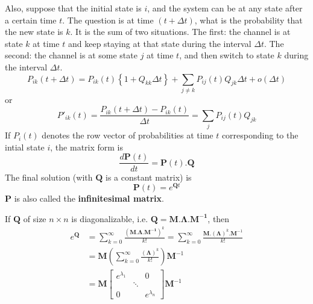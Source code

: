 Also, suppose that the initial state is $i$, and the system can be at any
state after a certain time $t$. The question is at time $(t+\Delta t)$, what
is the probability that the new state is $k$. It is the sum of two situations.
The first: the channel is at state $k$ at time $t$ and keep staying at that
state during the interval $\Delta t$. The second: the channel is at some state
$j$ at time $t$, and then switch to state $k$ during the interval $\Delta t$.
\begin{equation}
P_{ik}(t+\Delta t) = P_{ik}(t) \left\{ 1+ Q_{kk} \Delta t \right\} + \sum_{j\ne
k} P_{ij}(t)Q_{jk}\Delta t + o(\Delta t)
\end{equation}
or
\begin{equation}
P'_{ik}(t) = \frac{P_{ik}(t+\Delta t) - P_{ik}(t)}{\Delta t} = \sum_{j}
P_{ij}(t) Q_{jk}
\end{equation}
If $P_{i} (t)$ denotes the row vector of probabilities at time $t$ corresponding
to the intial state $i$, the matrix form is
\begin{equation}
\frac{d\mathbf{P}(t)}{dt} = \mathbf{P}(t).\mathbf{Q}
\end{equation}
The final solution (with $\mathbf{Q}$ is a constant matrix) is
\begin{equation}
\label{eq:4512}
\mathbf{P}(t) = e^{\mathbf{Q}t}
\end{equation}
$\mathbf{P}$ is also called the {\bf infinitesimal matrix}.

If $\mathbf{Q}$ of size $n\times n$ is diagonalizable, i.e.
$\mathbf{Q}=\mathbf{M.\Lambda.M^{-1}}$, then
\begin{equation}
\begin{split}
e^{\mathbf{Q}}&=\sum_{k=0}^\infty \frac{(\mathbf{M.\Lambda.M^{-1}})^k}{k!} =
\sum_{k=0}^\infty \frac{\mathbf{M}.(\mathbf{\Lambda})^k.\mathbf{M}^{-1}}{k!} \\
&=
\mathbf{M} \left( \sum_{k=0}^\infty \frac{\mathbf{(\Lambda)}^k}{k!} \right)
\mathbf{M}^{-1} \\
&=
\mathbf{M} \left[\begin{array}{ccc}
e^{\lambda_1} & & 0 \\
& \ddots &  \\
0 & & e^{\lambda_n}
\end{array} \right]
\mathbf{M}^{-1}
\end{split}
\end{equation}


